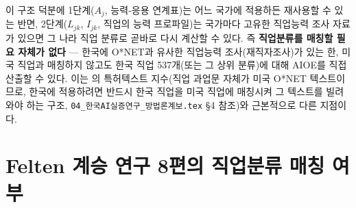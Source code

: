 \documentclass[11pt]{article}
\begin{document}
이 구조 덕분에 1단계($A_j$, 능력-응용 연계표)는 어느 국가에 적용하든 재사용할 수 있는 반면, 2단계($L_{jk}$, $I_{jk}$, 직업의 능력 프로파일)는 국가마다 고유한 직업능력 조사 자료가 있으면 그 나라 직업 분류로 곧바로 다시 계산할 수 있다. 즉 \textbf{직업분류를 매칭할 필요 자체가 없다} --- 한국에 O*NET과 유사한 직업능력 조사(재직자조사)가 있는 한, 미국 직업과 매칭하지 않고도 한국 직업 537개(또는 그 상위 분류)에 대해 AIOE를 직접 산출할 수 있다. 이는 \citet{webb-2020-impact-artificial-intelligence-labor}의 특허텍스트 지수(직업 과업문 자체가 미국 O*NET 텍스트이므로, 한국에 적용하려면 반드시 한국 직업을 미국 직업에 매칭시켜 그 텍스트를 빌려와야 하는 구조, \texttt{04\_한국AI실증연구\_방법론계보.tex} \S4 참조)와 근본적으로 다른 지점이다.

\section{Felten 계승 연구 8편의 직업분류 매칭 여부}
\end{document}
